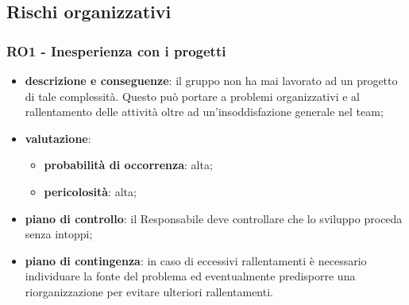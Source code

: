     

\subsection{Rischi organizzativi} %

    \subsubsection{RO1 - Inesperienza con i progetti} \label{sec:RO1}
        \begin{itemize}
            \item \textbf{descrizione e conseguenze}: il gruppo non ha mai lavorato ad un progetto di tale complessità. Questo può portare a problemi organizzativi e al rallentamento delle attività oltre ad un'insoddisfazione generale nel team;
            \item \textbf{valutazione}:
            \begin{itemize} 
                \item \textbf{probabilità di occorrenza}: alta;
                \item \textbf{pericolosità}: alta;
            \end{itemize}
            \item \textbf{piano di controllo}: il Responsabile deve controllare che lo sviluppo proceda senza intoppi;
            \item \textbf{piano di contingenza}: in caso di eccessivi rallentamenti è necessario individuare la fonte del problema ed eventualmente predisporre una riorganizzazione per evitare ulteriori rallentamenti.
        \end{itemize}
        

